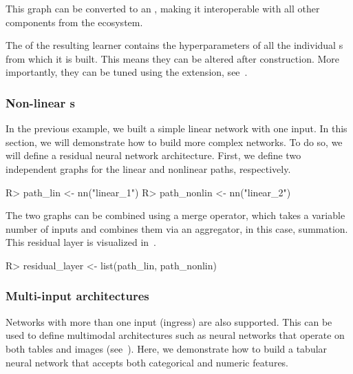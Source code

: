 \documentclass[article]{jss}
\theoremstyle{definition}
\begin{document}
This graph can be converted to an , making it interoperable with all other components from the  ecosystem.


The  of the resulting learner contains the hyperparameters of all the individual s from which it is built.
This means they can be altered after construction.
More importantly, they can be tuned using the  extension, see~.

\subsubsection[Non-linear Graphs]{Non-linear s}\label{sec:complex-architectures}

In the previous example, we built a simple linear network with one input.
In this section, we will demonstrate how to build more complex networks.
To do so, we will define a residual neural network architecture.
First, we define two independent graphs for the linear and nonlinear paths, respectively.

\begin{CodeInput}
R> path_lin <- nn("linear_1")
R> path_nonlin <- nn("linear_2") %
\end{CodeInput}

The two graphs can be combined using a merge operator, which takes a variable number of inputs and combines them via an aggregator, in this case, summation.
This residual layer is visualized in~.

\begin{CodeInput}
R> residual_layer <- list(path_lin, path_nonlin) %
\end{CodeInput}

\subsubsection{Multi-input architectures}

Networks with more than one input (ingress) are also supported.
This can be used to define multimodal architectures such as neural networks that operate on both tables and images (see~).
Here, we demonstrate how to build a tabular neural network that accepts both categorical and numeric features.
\end{document}

